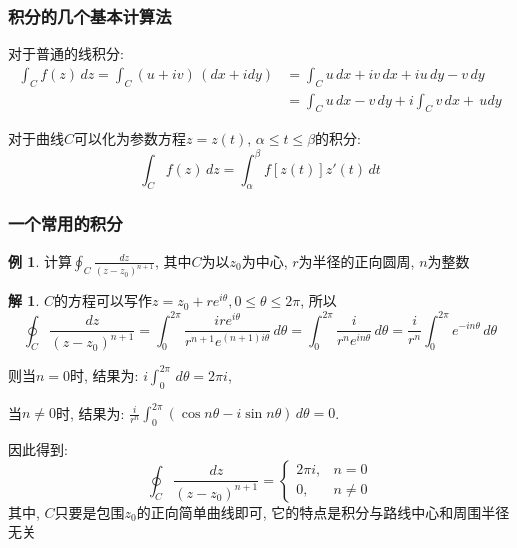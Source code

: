 \documentclass[12pt, a4paper, oneside]{ctexart}
\theoremstyle{plain}
\theoremstyle{definition}
\newtheorem{example}{例}
\theoremstyle{definition}
\newtheorem*{solution}{解}
\begin{document}
\subsubsection{积分的几个基本计算法}
对于普通的线积分:
\begin{align*}
    \int_{C}f(z)\,dz=\int_{C}(u+iv)\,(dx+idy) &= \int_{C}u\,dx+iv\,dx+iu\,dy-v\,dy \\
    &= \int_{C}u\,dx-v\,dy+i\int_{C}v\,dx+\,udy
\end{align*}

对于曲线$C$可以化为参数方程$z=z(t),\,\alpha\leq t\leq\beta$的积分:
\[
    \int_{C}f(z)\,dz=\int_{\alpha}^{\beta}f[z(t)]z'(t)\,dt
\]
\subsubsection{一个常用的积分}
\begin{example}
    计算$\oint_{C}\frac{dz}{(z-z_{0})^{n+1}}$, 其中$C$为以$z_{0}$为中心, $r$为半径的正向圆周, $n$为整数
\end{example}
\begin{solution}
    $C$的方程可以写作$z=z_{0}+re^{i\theta},0\leq\theta\leq2\pi$, 所以
    \[
        \oint_{C}\frac{dz}{(z-z_{0})^{n+1}}=\int_{0}^{2\pi}\frac{ire^{i\theta}}{r^{n+1}e^{(n+1)i\theta}}\,d\theta
        =\int_{0}^{2\pi}\frac{i}{r^{n}e^{in\theta}}\,d\theta=\frac{i}{r^{n}}\int_{0}^{2\pi}e^{-in\theta}\,d\theta
    \]

    则当$n=0$时, 结果为: $i\int_{0}^{2\pi}\,d\theta=2\pi i$,

    当$n\neq0$时, 结果为: $\frac{i}{r^{n}}\int_{0}^{2\pi}(\cos n\theta-i\sin n\theta)\,d\theta=0$.
\end{solution}
    \noindent 因此得到: 
    \[
        \oint_{C}\frac{dz}{(z-z_{0})^{n+1}}=
        \begin{cases}
            2\pi i, & n=0\\
            0, &n\neq 0
        \end{cases}
    \]
    其中, $C$只要是包围$z_{0}$的正向简单曲线即可, 它的特点是积分与路线中心和周围半径无关
\end{document}
